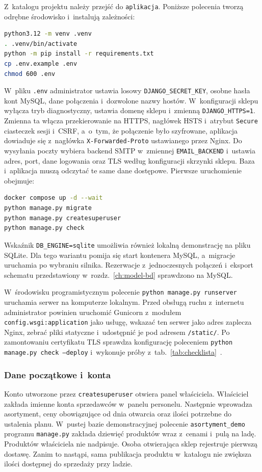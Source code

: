 \documentclass[12pt,a4paper,oneside]{article}
\newcounter{pu}
\begin{document}
Z~katalogu projektu należy przejść do \texttt{aplikacja}. Poniższe polecenia tworzą odrębne środowisko i~instalują zależności:
\begin{lstlisting}[language=bash]
python3.12 -m venv .venv
. .venv/bin/activate
python -m pip install -r requirements.txt
cp .env.example .env
chmod 600 .env
\end{lstlisting}
W~pliku \texttt{.env} administrator ustawia losowy \texttt{DJANGO\_SECRET\_KEY}, osobne hasła kont MySQL, dane połączenia i~dozwolone nazwy hostów. W~konfiguracji sklepu wyłącza tryb diagnostyczny, ustawia domenę sklepu i~zmienną \texttt{DJANGO\_HTTPS=1}. Zmienna ta włącza przekierowanie na HTTPS, nagłówek HSTS i~atrybut \texttt{Secure} ciasteczek sesji i~CSRF, a~o~tym, że połączenie było szyfrowane, aplikacja dowiaduje się z~nagłówka \texttt{X-Forwarded-Proto} ustawianego przez Nginx. Do wysyłania poczty wybiera backend SMTP w~zmiennej \texttt{EMAIL\_BACKEND} i~ustawia adres, port, dane logowania oraz TLS według konfiguracji skrzynki sklepu. Baza i~aplikacja muszą odczytać te same dane dostępowe. Pierwsze uruchomienie obejmuje:
\begin{lstlisting}[language=bash]
docker compose up -d --wait
python manage.py migrate
python manage.py createsuperuser
python manage.py check
\end{lstlisting}
Wskaźnik \texttt{DB\_ENGINE=sqlite} umożliwia również lokalną demonstrację na pliku SQLite. Dla tego wariantu pomija się start kontenera MySQL, a~migracje uruchamia po wybraniu silnika. Rezerwacje z~jednoczesnych połączeń i~eksport schematu przedstawiony w~rozdz.~\ref{ch:model-bd} sprawdzono na MySQL.

W~środowisku programistycznym polecenie \texttt{python manage.py runserver} uruchamia serwer na komputerze lokalnym. Przed obsługą ruchu z~internetu administrator powinien uruchomić Gunicorn z~modułem \texttt{config.wsgi:application} jako usługę, wskazać ten serwer jako adres zaplecza Nginx, zebrać pliki statyczne i~udostępnić je pod adresem \texttt{/static/}. Po zamontowaniu certyfikatu TLS sprawdza konfigurację poleceniem \texttt{python manage.py check --deploy} i~wykonuje próby z~tab.~\ref{tab:checklista}~\cite{django-wdrozenie}.


\subsubsection{Dane początkowe i~konta}

Konto utworzone przez \texttt{createsuperuser} otwiera panel właściciela. Właściciel zakłada imienne konta sprzedawców w~panelu personelu. Następnie wprowadza asortyment, ceny obowiązujące od dnia otwarcia oraz ilości potrzebne do ustalenia planu. W~pustej bazie demonstracyjnej polecenie \texttt{asortyment\_demo} programu \texttt{manage.py} zakłada dziewięć produktów wraz z~cenami i~pulą na ladę. Produktów właściciela nie nadpisuje. Osoba otwierająca sklep rejestruje pierwszą dostawę. Zanim to nastąpi, sama publikacja produktu w~katalogu nie zwiększa ilości dostępnej do sprzedaży przy ladzie.
\end{document}
